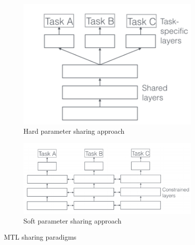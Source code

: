 \begin{figure}
    \centering
    \begin{subfigure}[b]{0.42\linewidth}        %
        \centering
        \includegraphics[width=\linewidth]{images/mtl hard.png}
        \caption{Hard parameter sharing approach}
        \label{fig:Hard}
    \end{subfigure}
    \begin{subfigure}[b]{0.54\linewidth}        %
        \centering
        \includegraphics[width=\linewidth]{images/mtl soft.png}
        
        \caption{Soft parameter sharing approach}
        \label{fig:Soft}
    \end{subfigure}
    \caption{MTL sharing paradigms \cite{MTLoverview}}

    \label{fig:MTLparadigms}
\end{figure}

